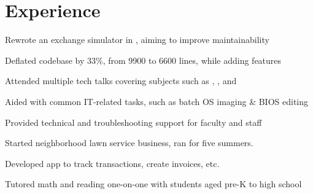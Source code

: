 \documentclass[]{deedy-resume-openfont}
\begin{document}
\hfill
\begin{minipage}[t]{0.66\textwidth} 


\section{Experience}

\vspace{\topsep} %
\begin{tightemize}
\item Rewrote an exchange simulator in , aiming to improve maintainability
\item Deflated codebase by 33\%, from 9900 to 6600 lines, while adding features
\item Attended multiple tech talks covering subjects such as , , and 
\end{tightemize}
\sectionsep

\begin{tightemize}
\item Aided with common IT-related tasks, such as batch OS imaging \& BIOS editing
\item Provided technical and troubleshooting support for faculty and staff
\end{tightemize}
\sectionsep

\begin{tightemize}
\item Started neighborhood lawn service business, ran for five summers. 
\item Developed  app to track transactions, create invoices, etc.
\end{tightemize}
\sectionsep

\begin{tightemize}
\item Tutored math and reading one-on-one with students aged pre-K to high school
\end{tightemize}
\sectionsep


\end{minipage}
\end{document}
